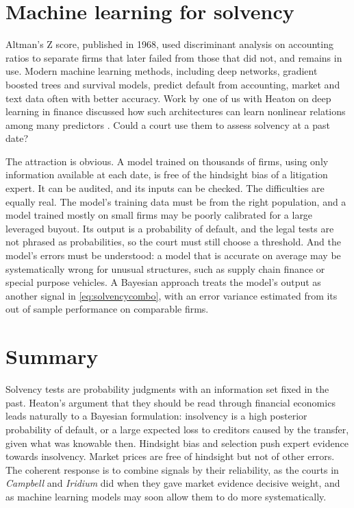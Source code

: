 \section{Machine learning for solvency}

Altman's Z score, published in 1968, used discriminant analysis on accounting ratios to separate firms that later failed from those that did not, and remains in use. Modern machine learning methods, including deep networks, gradient boosted trees and survival models, predict default from accounting, market and text data often with better accuracy. Work by one of us with Heaton on deep learning in finance discussed how such architectures can learn nonlinear relations among many predictors \citep{heaton2017}. Could a court use them to assess solvency at a past date?

The attraction is obvious. A model trained on thousands of firms, using only information available at each date, is free of the hindsight bias of a litigation expert. It can be audited, and its inputs can be checked. The difficulties are equally real. The model's training data must be from the right population, and a model trained mostly on small firms may be poorly calibrated for a large leveraged buyout. Its output is a probability of default, and the legal tests are not phrased as probabilities, so the court must still choose a threshold. And the model's errors must be understood: a model that is accurate on average may be systematically wrong for unusual structures, such as supply chain finance or special purpose vehicles. A Bayesian approach treats the model's output as another signal in \eqref{eq:solvencycombo}, with an error variance estimated from its out of sample performance on comparable firms.

\section{Summary}

Solvency tests are probability judgments with an information set fixed in the past. Heaton's argument that they should be read through financial economics leads naturally to a Bayesian formulation: insolvency is a high posterior probability of default, or a large expected loss to creditors caused by the transfer, given what was knowable then. Hindsight bias and selection push expert evidence towards insolvency. Market prices are free of hindsight but not of other errors. The coherent response is to combine signals by their reliability, as the courts in \emph{Campbell} and \emph{Iridium} did when they gave market evidence decisive weight, and as machine learning models may soon allow them to do more systematically.

